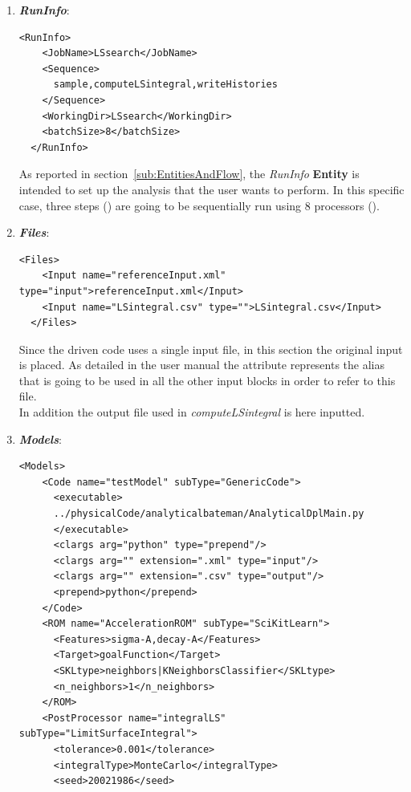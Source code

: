 \begin{enumerate}
   \item \textbf{\textit{RunInfo}}:
\begin{lstlisting}[style=XML,morekeywords={arg,extension,pauseAtEnd,overwrite}]
  <RunInfo>
    <JobName>LSsearch</JobName>
    <Sequence>
      sample,computeLSintegral,writeHistories
    </Sequence>
    <WorkingDir>LSsearch</WorkingDir>
    <batchSize>8</batchSize>
  </RunInfo>
\end{lstlisting}   
   As reported in section~\ref{sub:EntitiesAndFlow}, the \textit{RunInfo} \textbf{Entity} is intended to set up the analysis 
   that the user wants to perform. In this specific case, three steps () are going to be sequentially run 
   using 8 processors (). 
   \item \textbf{\textit{Files}}:
\begin{lstlisting}[style=XML,morekeywords={arg,extension,pauseAtEnd,overwrite}]
  <Files>
    <Input name="referenceInput.xml" type="input">referenceInput.xml</Input>
    <Input name="LSintegral.csv" type="">LSintegral.csv</Input>
  </Files>
\end{lstlisting}
   Since the driven code uses a single input file, in this section the original input is placed. As detailed in the user manual
   the attribute   represents the alias that is going to be 
   used in all the other input blocks in order to refer to this file. 
   \\In addition the output file used in  
   \textit{computeLSintegral} is here inputted.
   \item \textbf{\textit{Models}}:
\begin{lstlisting}[style=XML,morekeywords={arg,extension,pauseAtEnd,overwrite}]
  <Models>
    <Code name="testModel" subType="GenericCode">
      <executable>
      ../physicalCode/analyticalbateman/AnalyticalDplMain.py
      </executable>
      <clargs arg="python" type="prepend"/>
      <clargs arg="" extension=".xml" type="input"/>
      <clargs arg="" extension=".csv" type="output"/>
      <prepend>python</prepend>
    </Code>
    <ROM name="AccelerationROM" subType="SciKitLearn">
      <Features>sigma-A,decay-A</Features>
      <Target>goalFunction</Target>
      <SKLtype>neighbors|KNeighborsClassifier</SKLtype>
      <n_neighbors>1</n_neighbors>
    </ROM>
    <PostProcessor name="integralLS" subType="LimitSurfaceIntegral">
      <tolerance>0.001</tolerance>
      <integralType>MonteCarlo</integralType>
      <seed>20021986</seed>

\end{lstlisting}
\end{enumerate}

